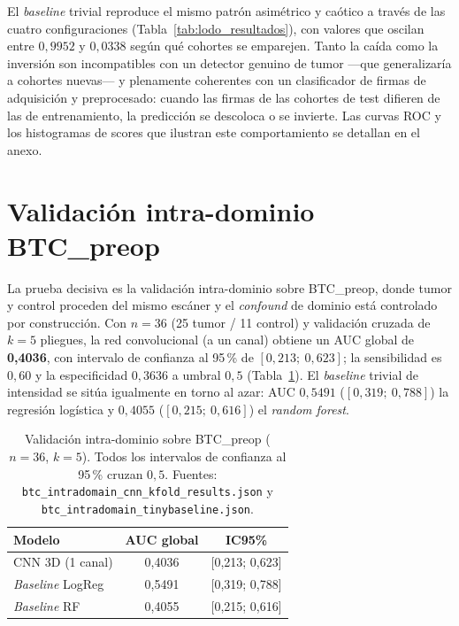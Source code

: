 El \emph{baseline} trivial reproduce el mismo patrón asimétrico y caótico a
través de las cuatro configuraciones (Tabla~\ref{tab:lodo_resultados}), con
valores que oscilan entre $0{,}9952$ y $0{,}0338$ según qué cohortes se
emparejen. Tanto la caída como la inversión son incompatibles con un detector
genuino de tumor ---que generalizaría a cohortes nuevas--- y plenamente
coherentes con un clasificador de firmas de adquisición y preprocesado: cuando
las firmas de las cohortes de test difieren de las de entrenamiento, la
predicción se descoloca o se invierte. Las curvas ROC y los histogramas de
scores que ilustran este comportamiento se detallan en el anexo.

\section{Validación intra-dominio BTC\_preop}

La prueba decisiva es la validación intra-dominio sobre BTC\_preop, donde tumor
y control proceden del mismo escáner y el \emph{confound} de dominio está
controlado por construcción. Con $n=36$ (25 tumor / 11 control) y validación
cruzada de $k=5$ pliegues, la red convolucional (a un canal) obtiene un AUC
global de \textbf{0,4036}, con intervalo de confianza al 95\,\% de
$[0{,}213;\ 0{,}623]$; la sensibilidad es $0{,}60$ y la especificidad $0{,}3636$
a umbral $0{,}5$ (Tabla~\ref{tab:btc_resultados}). El \emph{baseline} trivial de
intensidad se sitúa igualmente en torno al azar: AUC $0{,}5491$
($[0{,}319;\ 0{,}788]$) la regresión logística y $0{,}4055$
($[0{,}215;\ 0{,}616]$) el \emph{random forest}.

\begin{table}[ht]
  \centering
  \caption[Resultados de validación intra-dominio BTC\_preop]{Validación
  intra-dominio sobre BTC\_preop ($n=36$, $k=5$). Todos los intervalos de
  confianza al 95\,\% cruzan $0{,}5$. Fuentes:
  \texttt{btc\_intradomain\_cnn\_kfold\_results.json} y
  \texttt{btc\_intradomain\_tinybaseline.json}.}
  \label{tab:btc_resultados}
  \begin{tabular}{l c c}
    \hline
    \textbf{Modelo} & \textbf{AUC global} & \textbf{IC95\%} \\
    \hline
    CNN 3D (1 canal)         & 0,4036 & [0,213; 0,623] \\
    \emph{Baseline} LogReg   & 0,5491 & [0,319; 0,788] \\
    \emph{Baseline} RF       & 0,4055 & [0,215; 0,616] \\
    \hline
  \end{tabular}
\end{table}


